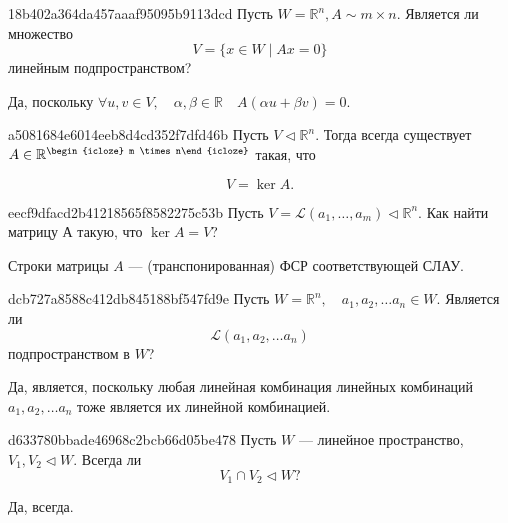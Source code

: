 \begin{note}{18b402a364da457aaaf95095b9113dcd}
    Пусть \( W = \mathbb R ^{n}, A \sim m \times n. \)
    Является ли множество
    \[
        V = \{ x \in W \mid Ax = 0  \}
    \]
    линейным подпространством?

    \begin{cloze}{1}
        Да, поскольку \( \forall u, v \in V, \quad \alpha, \beta \in \mathbb R \quad A(\alpha u + \beta v) = 0. \)
    \end{cloze}
\end{note}

\begin{note}{a5081684e6014eeb8d4cd352f7dfd46b}
    Пусть \( V \triangleleft \mathbb R ^{n}. \) Тогда всегда существует \( A \in \mathbb R ^{\begin{icloze}{2}m \times n\end{icloze}}  \) такая, что
    \begin{icloze}{1}\[
        V = \ker A.
    \]\end{icloze}
\end{note}

\begin{note}{eecf9dfacd2b41218565f8582275c53b}
    Пусть \({ V = \mathscr L (a_1, \ldots, a_m) \triangleleft \mathbb R^{n} }\). Как найти матрицу \({ А }\) такую, что \({ \ker A = V }\)?

    \begin{cloze}{1}
        Строки матрицы \({ A }\) --- (транспонированная) ФСР соответствующей СЛАУ.
    \end{cloze}
\end{note}

\begin{note}{dcb727a8588c412db845188bf547fd9e}
    Пусть \( W = \mathbb R ^{n}, \quad a_1, a_2, \ldots a_n \in W. \) Является ли
    \[
        \mathscr L (a_1, a_2, \ldots a_n)
    \]
    подпространством в \( W \)?

    \begin{cloze}{1}
        Да, является, поскольку любая линейная комбинация линейных комбинаций \( a_1, a_2, \ldots a_n  \)  тоже является их линейной комбинацией.
    \end{cloze}
\end{note}

\begin{note}{d633780bbade46968c2bcb66d05be478}
    Пусть \( W \) --- линейное пространство, \( V_1, V_2 \triangleleft W \).
    Всегда ли
    \[
        V_1 \cap V_2 \triangleleft W?
    \]


    \begin{cloze}{1}
        Да, всегда.
    \end{cloze}
\end{note}

